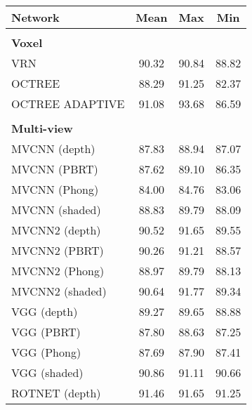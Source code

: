 \begin{table}[!h]
    \centering
	    \begin{tabular}{lccc}
	    	\hline
	    	\textbf{Network}       & \textbf{Mean} & \textbf{Max} & \textbf{Min} \\ \hline
	    	                       &               &              &              \\
	    	\textbf{Voxel }        &               &              &              \\
	    	VRN                    &     90.32     &    90.84     &    88.82     \\
	    	OCTREE                 &     88.29     &    91.25     &    82.37     \\
	    	OCTREE ADAPTIVE        &     91.08     &    93.68     &    86.59     \\ \hline
	    	                       &               &              &              \\
	    	\textbf{Multi-view }   &               &              &              \\
	    	MVCNN (depth)          &     87.83     &    88.94     &    87.07     \\
	    	MVCNN (PBRT)           &     87.62     &    89.10     &    86.35     \\
	    	MVCNN (Phong)          &     84.00     &    84.76     &    83.06     \\
	    	MVCNN (shaded)         &     88.83     &    89.79     &    88.09     \\
	    	MVCNN2 (depth)         &     90.52     &    91.65     &    89.55     \\
	    	MVCNN2 (PBRT)          &     90.26     &    91.21     &    88.57     \\
	    	MVCNN2 (Phong)         &     88.97     &    89.79     &    88.13     \\
	    	MVCNN2 (shaded)        &     90.64     &    91.77     &    89.34     \\
	    	VGG (depth)            &     89.27     &    89.65     &    88.88     \\
	    	VGG (PBRT)             &     87.80     &    88.63     &    87.25     \\
	    	VGG (Phong)            &     87.69     &    87.90     &    87.41     \\
	    	VGG (shaded)           &     90.86     &    91.11     &    90.66     \\
	    	ROTNET (depth)         &     91.46     &    91.65     &    91.25     \\

\end{tabular}
\end{table}
